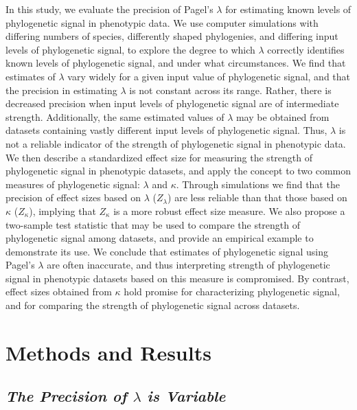 \documentclass[]{article}
\begin{document}
In this study, we evaluate the precision of Pagel's \(\lambda\) for
estimating known levels of phylogenetic signal in phenotypic data. We
use computer simulations with differing numbers of species, differently
shaped phylogenies, and differing input levels of phylogenetic signal,
to explore the degree to which \(\lambda\) correctly identifies known
levels of phylogenetic signal, and under what circumstances. We find
that estimates of \(\lambda\) vary widely for a given input value of
phylogenetic signal, and that the precision in estimating \(\lambda\) is
not constant across its range. Rather, there is decreased precision when
input levels of phylogenetic signal are of intermediate strength.
Additionally, the same estimated values of \(\lambda\) may be obtained
from datasets containing vastly different input levels of phylogenetic
signal. Thus, \(\lambda\) is not a reliable indicator of the strength of
phylogenetic signal in phenotypic data. We then describe a standardized
effect size for measuring the strength of phylogenetic signal in
phenotypic datasets, and apply the concept to two common measures of
phylogenetic signal: \(\lambda\) and \(\kappa\). Through simulations we
find that the precision of effect sizes based on \(\lambda\)
(\(Z_{\lambda}\)) are less reliable than that those based on \(\kappa\)
(\(Z_\kappa\)), implying that \(Z_\kappa\) is a more robust effect size
measure. We also propose a two-sample test statistic that may be used to
compare the strength of phylogenetic signal among datasets, and provide
an empirical example to demonstrate its use. We conclude that estimates
of phylogenetic signal using Pagel's \(\lambda\) are often inaccurate,
and thus interpreting strength of phylogenetic signal in phenotypic
datasets based on this measure is compromised. By contrast, effect sizes
obtained from \(\kappa\) hold promise for characterizing phylogenetic
signal, and for comparing the strength of phylogenetic signal across
datasets.

\hypertarget{methods-and-results}{%
\section{Methods and Results}\label{methods-and-results}}

\hypertarget{the-precision-of-lambda-is-variable}{%
\subsection{\texorpdfstring{\emph{The Precision of \(\lambda\) is
Variable}}{The Precision of \textbackslash{}lambda is Variable}}\label{the-precision-of-lambda-is-variable}}
\end{document}
